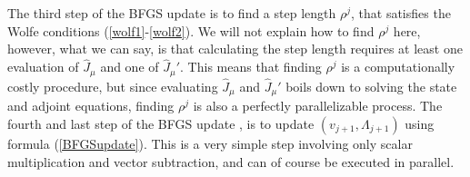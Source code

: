 \\
\\
The third step of the BFGS update is to find a step length $\rho^j$, that satisfies the Wolfe conditions (\ref{wolf1}-\ref{wolf2}). We will not explain how to find $\rho^j$ here, however, what we can say, is that calculating the step length requires at least one evaluation of $\hat J_{\mu}$ and one of $\hat J_{\mu}'$. This means that finding $\rho^j$ is a computationally costly procedure, but since evaluating $\hat J_{\mu}$ and $\hat J_{\mu}'$ boils down to solving the state and adjoint equations, finding $\rho^j$ is also a perfectly parallelizable process. The fourth and last step of the BFGS update , is to update $(v_{j+1},\Lambda_{j+1})$ using formula (\ref{BFGSupdate}). This is a very simple step involving only scalar multiplication and vector subtraction, and can of course be executed in parallel.
